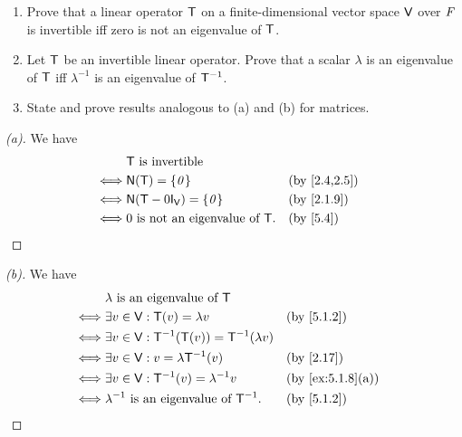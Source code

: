 \begin{ex}\label{ex:5.1.8}
  \begin{enumerate}
    \item Prove that a linear operator \(\mathsf{T}\) on a finite-dimensional vector space \(\mathsf{V}\) over \(\mathit{F}\) is invertible iff zero is not an eigenvalue of \(\mathsf{T}\).
    \item Let \(\mathsf{T}\) be an invertible linear operator.
          Prove that a scalar \(\lambda\) is an eigenvalue of \(\mathsf{T}\) iff \(\lambda^{-1}\) is an eigenvalue of \(\mathsf{T}^{-1}\).
    \item State and prove results analogous to (a) and (b) for matrices.
  \end{enumerate}
\end{ex}

\begin{proof}[(a)]
  We have
  \begin{align*}
         & \T \text{ is invertible}                                 \\
    \iff & \ns{\T} = \set{\zv}                    &  & \by{2.4,2.5} \\
    \iff & \ns{\T - 0 \IT[\V]} = \set{\zv}        &  & \by{2.1.9}   \\
    \iff & 0 \text{ is not an eigenvalue of } \T. &  & \by{5.4}
  \end{align*}
\end{proof}

\begin{proof}[(b)]
  We have
  \begin{align*}
         & \lambda \text{ is an eigenvalue of } \T                                      \\
    \iff & \exists v \in \V : \T(v) = \lambda v                   &  & \by{5.1.2}       \\
    \iff & \exists v \in \V : \T^{-1}(\T(v)) = \T^{-1}(\lambda v)                       \\
    \iff & \exists v \in \V : v = \lambda \T^{-1}(v)              &  & \by{2.17}        \\
    \iff & \exists v \in \V : \T^{-1}(v) = \lambda^{-1} v         &  & \by{ex:5.1.8}[a] \\
    \iff & \lambda^{-1} \text{ is an eigenvalue of } \T^{-1}.     &  & \by{5.1.2}
  \end{align*}
\end{proof}

